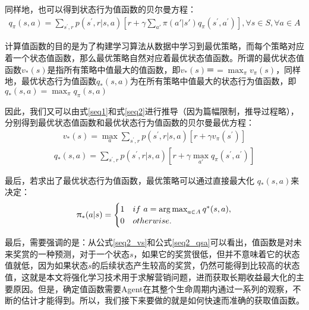 同样地，也可以得到状态行为值函数的贝尔曼方程：
\begin{equation}
\label{seq2}
\begin{aligned}
q_{\pi}(s,a)=\sum_{s^{'},r}p(s^{'},r|s,a)[r+\gamma \sum_{a'}\pi(a'|s') q_{\pi}(s^{'},a^{'})], \forall s \in S, \forall a \in A
\end{aligned}
\end{equation}

计算值函数的目的是为了构建学习算法从数据中学习到最优策略，而每个策略对应着一个状态值函数，那么最优策略自然对应着最优状态值函数。所谓的最优状态值函数$v_{*}(s)$是指所有策略中值最大的值函数，即$v_{*}(s)＝=\max_{\pi}v_{\pi}(s)$，同样地，最优状态行为值函数$q_{*}(s,a)$为在所有策略中值最大的状态行为值函数，即$q_{*}(s,a)=\max_{\pi}q_{\pi}(s,a)$

因此，我们又可以由式\eqref{seq1}和式\eqref{seq2}进行推导（因为篇幅限制，推导过程略），分别得到最优状态值函数和最优状态行为值函数的贝尔曼最优方程：
\begin{equation}
\begin{aligned}
v_{*}(s)=\max_{a}\sum_{s^{'},r}p(s^{'},r|s,a)[r+\gamma v_{\pi}(s^{'})]
\end{aligned}
\end{equation}
\begin{equation}
\begin{aligned}
q_{*}(s,a)=\sum_{s^{'},r}p(s^{'},r|s,a)[r+\gamma \max_{a'} q_{\pi}(s^{'},a^{'})]
\end{aligned}
\end{equation}

最后，若求出了最优状态行为值函数，最优策略可以通过直接最大化 $q_{*}(s,a)$来决定：
\begin{equation}
\begin{aligned}
\uppi_{*}(a|s) = 
    \begin{cases}
        1 & if \ a=\operatorname*{arg\,max}_{a\in A}{q^{*}(s,a)},\\
        0 & otherwise.
    \end{cases}
\end{aligned}
\end{equation}

最后，需要强调的是：从公式\eqref{seq2_vs}和公式\eqref{seq2_qsa}可以看出，值函数是对未来奖赏的一种预测，对于一个状态$s$，如果它的奖赏很低，但并不意味着它的状态值就低，因为如果状态$s$的后续状态产生较高的奖赏，仍然可能得到比较高的状态值，这就是本文将强化学习技术用于求解营销问题，进而获取长期收益最大化的主要原因。但是，确定值函数需要Agent在其整个生命周期内通过一系列的观察，不断的估计才能得到。所以，我们接下来要做的就是如何快速而准确的获取值函数。

